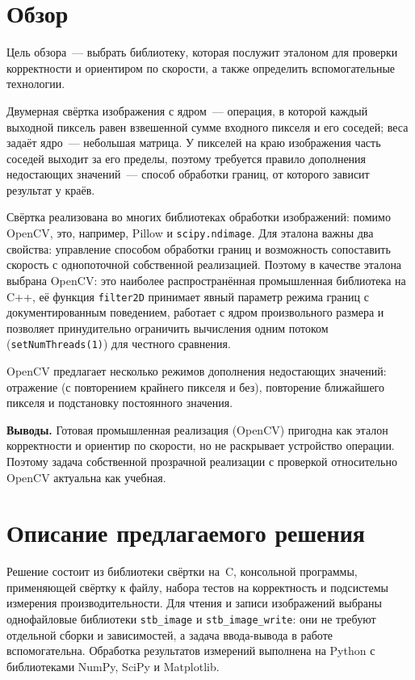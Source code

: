 \documentclass[a4paper]{article}
\begin{document}
\section{Обзор}

Цель обзора~--- выбрать библиотеку, которая послужит эталоном для проверки корректности и ориентиром по скорости, а также определить вспомогательные технологии.

Двумерная свёртка изображения с ядром~--- операция, в которой каждый выходной пиксель равен взвешенной сумме входного пикселя и его соседей; веса задаёт ядро~--- небольшая матрица. У пикселей на краю изображения часть соседей выходит за его пределы, поэтому требуется правило дополнения недостающих значений~--- способ обработки границ, от которого зависит результат у краёв. 

Свёртка реализована во многих библиотеках обработки изображений: помимо OpenCV, это, например, Pillow и \newline \texttt{scipy.ndimage}. Для эталона важны два свойства: управление способом обработки границ и возможность сопоставить скорость с однопоточной собственной реализацией. Поэтому в качестве эталона выбрана OpenCV: это наиболее распространённая промышленная библиотека на C++, её функция \texttt{filter2D} принимает явный параметр режима границ с документированным поведением, работает с ядром произвольного размера и позволяет принудительно ограничить вычисления одним потоком (\texttt{setNumThreads(1)}) для честного сравнения.

OpenCV предлагает несколько режимов дополнения недостающих значений: отражение (с повторением крайнего пикселя и без), повторение ближайшего пикселя и подстановку постоянного значения. 

\textbf{Выводы.} Готовая промышленная реализация (OpenCV) пригодна как эталон корректности и ориентир по скорости, но не раскрывает устройство операции. Поэтому задача собственной прозрачной реализации с проверкой относительно OpenCV актуальна как учебная.

\section{Описание предлагаемого решения}

Решение состоит из библиотеки свёртки на~C, консольной программы, применяющей свёртку к файлу, набора тестов на корректность и подсистемы измерения производительности. Для чтения и записи изображений выбраны однофайловые библиотеки \texttt{stb\_image} и \texttt{stb\_image\_write}: они не требуют отдельной сборки и зависимостей, а задача ввода-вывода в работе вспомогательна. Обработка результатов измерений выполнена на Python с библиотеками NumPy, SciPy и Matplotlib.
\end{document}

